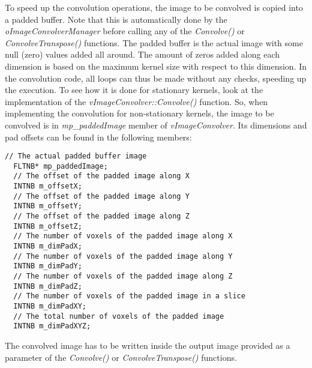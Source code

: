 \documentclass[a4paper, 11pt]{article}
\begin{document}
To speed up the convolution operations, the image to be convolved is copied into a padded buffer. Note that this is automatically done by the \textit{oImageConvolverManager} before
calling any of the \textit{Convolve()} or \textit{ConvolveTranspose()} functions. The padded buffer is the actual image with some null (zero) values added all around. The amount of
zeros added along each dimension is based on the maximum kernel size with respect to this dimension. In the convolution code, all loops can thus be made without any checks, speeding
up the execution. To see how it is done for stationary kernels, look at the implementation of the \textit{vImageConvolver::Convolve()} function. So, when implementing the convolution
for non-stationary kernels, the image to be convolved is in \textit{mp\_paddedImage} member of \textit{vImageConvolver}. Its dimensions and pad offsets can be found in the following
members:

\begin{lstlisting}[label={Pad members},caption={Variables members of vImageConvolver describing the padded image buffer.}]
  // The actual padded buffer image
  FLTNB* mp_paddedImage;
  // The offset of the padded image along X
  INTNB m_offsetX;
  // The offset of the padded image along Y
  INTNB m_offsetY;
  // The offset of the padded image along Z
  INTNB m_offsetZ;
  // The number of voxels of the padded image along X
  INTNB m_dimPadX;
  // The number of voxels of the padded image along Y
  INTNB m_dimPadY;
  // The number of voxels of the padded image along Z
  INTNB m_dimPadZ;
  // The number of voxels of the padded image in a slice
  INTNB m_dimPadXY;
  // The total number of voxels of the padded image
  INTNB m_dimPadXYZ;
\end{lstlisting}

The convolved image has to be written inside the output image provided as a parameter of the \textit{Convolve()} or \textit{ConvolveTranspose()} functions.
\end{document}
